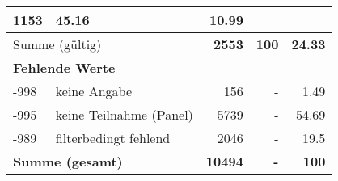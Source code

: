 \begin{longtable}{lXrrr}
       \num{1153} &
       \num[round-mode=places,round-precision=2]{45,16} &
         \num[round-mode=places,round-precision=2]{10,99} \\
     \midrule
     \multicolumn{2}{l}{Summe (gültig)} &
       \textbf{\num{2553}} &
     \textbf{100} &
       \textbf{\num[round-mode=places,round-precision=2]{24,33}} \\
     \multicolumn{5}{l}{\textbf{Fehlende Werte}}\\
       -998 &
       keine Angabe &
         \num{156} &
        - &
         \num[round-mode=places,round-precision=2]{1,49} \\
       -995 &
       keine Teilnahme (Panel) &
         \num{5739} &
        - &
         \num[round-mode=places,round-precision=2]{54,69} \\
       -989 &
       filterbedingt fehlend &
         \num{2046} &
        - &
         \num[round-mode=places,round-precision=2]{19,5} \\
     \midrule
     \multicolumn{2}{l}{\textbf{Summe (gesamt)}} &
          \textbf{\num{10494}} &
        \textbf{-} &
        \textbf{100} \\
     \bottomrule
     \end{longtable}
     
